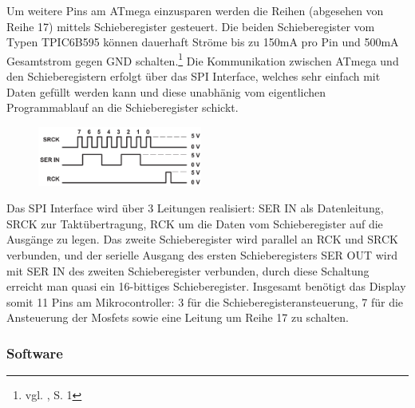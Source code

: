 Um weitere Pins am ATmega einzusparen werden die Reihen (abgesehen von Reihe 17)
mittels Schieberegister gesteuert. Die beiden Schieberegister vom Typen
TPIC6B595 können dauerhaft Ströme bis zu 150mA pro Pin und 500mA Gesamtstrom gegen GND
schalten.\footnote{vgl. \cite{6b595}, S. 1} Die Kommunikation zwischen ATmega
und den Schieberegistern erfolgt über das SPI Interface, welches sehr einfach mit Daten gefüllt werden kann und
diese unabhänig vom eigentlichen Programmablauf an die Schieberegister schickt.

\begin{figure}
  \vspace{-25pt}
  \begin{center}
    \includegraphics[width=0.48\textwidth]{skizzen/schieberegister_linien.png}
  \end{center}
  \vspace{-20pt}
\end{figure}

Das SPI Interface wird über 3 Leitungen realisiert: SER IN als Datenleitung,
SRCK zur Taktübertragung, RCK um die Daten vom Schieberegister auf die
Ausgänge zu legen. Das zweite Schieberegister wird parallel an RCK und SRCK
verbunden, und der serielle Ausgang des ersten Schieberegisters SER OUT wird mit
SER IN des zweiten Schieberegister verbunden, durch diese Schaltung erreicht man
quasi ein 16-bittiges Schieberegister.
Insgesamt benötigt das Display somit 11 Pins am Mikrocontroller: 3 für die
Schieberegisteransteuerung, 7 für die Ansteuerung der Mosfets sowie eine Leitung
um Reihe 17 zu schalten.
\subsubsection{Software}

